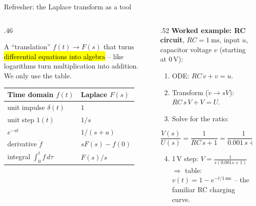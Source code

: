 \documentclass[aspectratio=169,10pt]{beamer}
\begin{document}
\begin{frame}{Refresher: the Laplace transform as a tool}
\begin{columns}[T]
\begin{column}{.46\textwidth}
\begin{defbox}
\small
A ``translation'' $f(t)\rightarrow F(s)$ that turns \hl{differential equations into algebra} -- like logarithms turn multiplication into addition. We only use the table.
\end{defbox}
\small
\centering
\renewcommand{\arraystretch}{1.05}
\begin{tabular}{@{}ll@{}}
\toprule
Time domain $f(t)$ & Laplace $F(s)$\\
\midrule
unit impulse $\delta(t)$ & $1$\\
unit step $1(t)$ & $1/s$\\
$e^{-at}$ & $1/(s+a)$\\
derivative $\dot f$ & $sF(s)-f(0)$\\
integral $\int_0^tf\,d\tau$ & $F(s)/s$\\
\bottomrule
\end{tabular}
\end{column}
\begin{column}{.52\textwidth}
\small
\textbf{Worked example: RC circuit}, $RC=\SI{1}{\milli\second}$, input $u$, capacitor voltage $v$ (starting at 0\,V):
\begin{enumerate}\setlength\itemsep{1pt}
  \item ODE: $RC\,\dot v+v=u$.
  \item Transform ($\dot v\rightarrow sV$): $RC\,s\,V+V=U$.
  \item Solve for the ratio:
\end{enumerate}
\begin{eqbox}
$\dfrac{V(s)}{U(s)}=\dfrac{1}{RC\,s+1}=\dfrac{1}{0.001\,s+1}$
\end{eqbox}
\begin{enumerate}\setcounter{enumi}{3}
  \item 1\,V step: $V=\frac{1}{s(0.001s+1)}$ $\Rightarrow$ table: $v(t)=1-e^{-t/1\,\mathrm{ms}}$ -- the familiar RC charging curve.
\end{enumerate}
\end{column}
\end{columns}
\end{frame}
\end{document}
